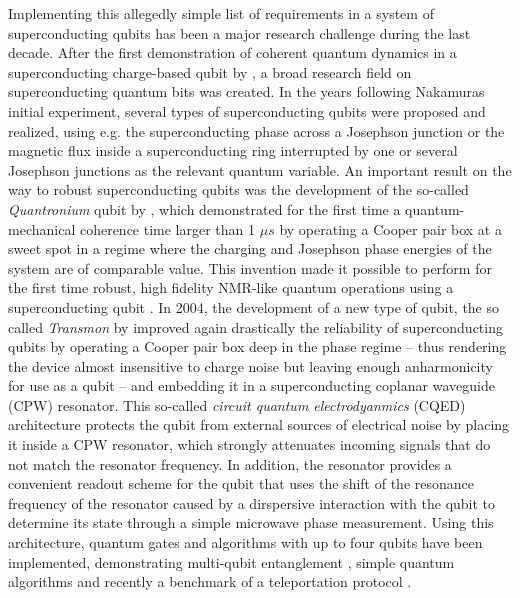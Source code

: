 Implementing this allegedly simple list of requirements in a system of superconducting qubits has been a major research challenge during the last decade. After the first demonstration of coherent quantum dynamics in a superconducting charge-based qubit by \cite{nakamura_coherent_1999}, a broad research field on superconducting quantum bits was created. In the years following Nakamuras initial experiment, several types of superconducting qubits were proposed and realized, using e.g. the superconducting phase \citep{martinis_energy-level_1985,martinis_rabi_2002} across a Josephson junction or the magnetic flux \citep{mooij_josephson_1999,chiorescu_coherent_2003} inside a superconducting ring interrupted by one or several Josephson junctions as the relevant quantum variable. An important result on the way to robust superconducting qubits was the development of the so-called {\it Quantronium} qubit by \cite{vion_manipulating_2002}, which demonstrated for the first time a quantum-mechanical coherence time larger than 1 $\mu s$ by operating a Cooper pair box at a sweet spot in a regime where the charging and Josephson phase energies of the system are of comparable value. This invention made it possible to perform for the first time robust, high fidelity NMR-like quantum operations using a superconducting qubit \citep{collin_nmr-like_2004}. In 2004, the development of a new type of qubit, the so called {\it Transmon} by \cite{wallraff_strong_2004} improved again drastically the reliability of superconducting qubits by operating a Cooper pair box deep in the phase regime -- thus rendering the device almost insensitive to charge noise but leaving enough anharmonicity for use as a qubit -- and embedding it in a superconducting coplanar waveguide (CPW) resonator. This so-called {\it circuit quantum electrodyanmics} (CQED) architecture \citep{blais_cavity_2004} protects the qubit from external sources of electrical noise by placing it inside a CPW resonator, which strongly attenuates incoming signals that do not match the resonator frequency. In addition, the resonator provides a convenient readout scheme for the qubit that uses the shift of the resonance frequency of the resonator caused by a dirspersive interaction with the qubit to determine its state through a simple microwave phase measurement. Using this architecture, quantum gates and algorithms with up to four qubits have been implemented, demonstrating multi-qubit entanglement \citep{dicarlo_preparation_2010}, simple quantum algorithms \citep{dicarlo_demonstration_2009} and recently a benchmark of a teleportation protocol \citep{baur_benchmarking_2011}.

